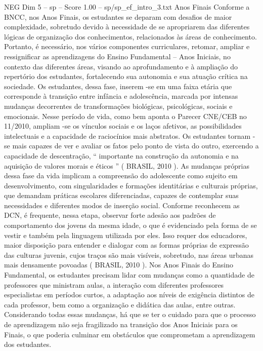 \begin{textsample}{NEG Dim 5 – sp – Score 1.00 – sp/sp\_ef\_intro\_3.txt}  \label{ex:f5_neg_218}
Anos Finais Conforme a BNCC, nos Anos Finais, os estudantes se deparam com desafios de maior complexidade, sobretudo devido à necessidade de se apropriarem das diferentes lógicas de organização dos conhecimentos, relacionados às áreas de conhecimento.
Portanto, é necessário, nos vários componentes curriculares, retomar, ampliar e ressignificar as aprendizagens do Ensino Fundamental – Anos Iniciais, no contexto das diferentes áreas, visando ao aprofundamento e à ampliação do repertório dos estudantes, fortalecendo sua autonomia e sua atuação crítica na sociedade.
Os estudantes, dessa fase, inserem -se em uma faixa etária que corresponde à transição entre infância e adolescência, marcada por intensas mudanças decorrentes de transformações biológicas, psicológicas, sociais e emocionais.
Nesse período de vida, como bem aponta o Parecer CNE/CEB no 11/2010, ampliam -se os vínculos sociais e os laços afetivos, as possibilidades intelectuais e a capacidade de raciocínios mais abstratos.
Os estudantes tornam -se mais capazes de ver e avaliar os fatos pelo ponto de vista do outro, exercendo a capacidade de descentração, “ importante na construção da autonomia e na aquisição de valores morais e éticos ” ( BRASIL, 2010 ).
As mudanças próprias dessa fase da vida implicam a compreensão do adolescente como sujeito em desenvolvimento, com singularidades e formações identitárias e culturais próprias, que demandam práticas escolares diferenciadas, capazes de contemplar suas necessidades e diferentes modos de inserção social.
Conforme reconhecem as DCN, é frequente, nessa etapa, observar forte adesão aos padrões de comportamento dos jovens da mesma idade, o que é evidenciado pela forma de se vestir e também pela linguagem utilizada por eles.
Isso requer dos educadores, maior disposição para entender e dialogar com as formas próprias de expressão das culturas juvenis, cujos traços são mais visíveis, sobretudo, nas áreas urbanas mais densamente povoadas ( BRASIL, 2010 ).
Nos Anos Finais do Ensino Fundamental, os estudantes precisam lidar com mudanças como a quantidade de professores que ministram aulas, a interação com diferentes professores especialistas em períodos curtos, a adaptação aos níveis de exigência distintos de cada professor, bem como a organização e didática das aulas, entre outras.
Considerando todas essas mudanças, há que se ter o cuidado para que o processo de aprendizagem não seja fragilizado na transição dos Anos Iniciais para os Finais, o que poderia culminar em obstáculos que comprometam a aprendizagem dos estudantes.

\end{textsample}
